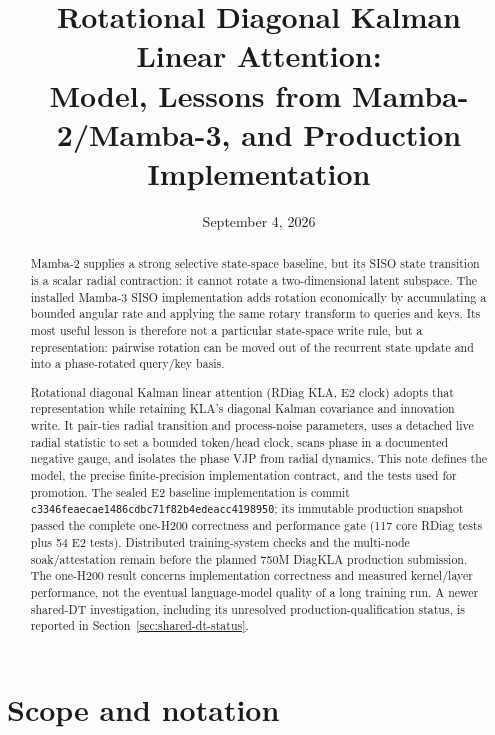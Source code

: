 \documentclass[11pt]{article}
\title{Rotational Diagonal Kalman Linear Attention:\\
Model, Lessons from Mamba-2/Mamba-3, and Production Implementation}
\author{}
\date{September 4, 2026}
\begin{document}
\maketitle

\begin{abstract}
Mamba-2 supplies a strong selective state-space baseline, but its SISO state transition is a
scalar radial contraction: it cannot rotate a two-dimensional latent subspace.  The installed
Mamba-3 SISO implementation adds rotation economically by accumulating a bounded angular rate and
applying the same rotary transform to queries and keys.  Its most useful lesson is therefore not a
particular state-space write rule, but a representation: pairwise rotation can be moved out of the
recurrent state update and into a phase-rotated query/key basis.

Rotational diagonal Kalman linear attention (RDiag KLA, E2 clock) adopts that representation while
retaining KLA's diagonal Kalman covariance and innovation write.  It pair-ties radial transition
and process-noise parameters, uses a detached live radial statistic to set a bounded token/head
clock, scans phase in a documented negative gauge, and isolates the phase VJP from radial dynamics.
This note defines the model, the precise finite-precision implementation contract, and the tests
used for promotion.  The sealed E2 baseline implementation is commit
\texttt{c3346feaecae1486cdbc71f82b4edeacc4198950}; its immutable production snapshot passed the
complete one-H200 correctness and performance gate (117 core RDiag tests plus 54 E2 tests).
Distributed training-system checks and the multi-node soak/attestation remain before the planned
750M DiagKLA production submission.  The one-H200 result concerns implementation correctness and
measured kernel/layer performance, not the eventual language-model quality of a long training run.
A newer shared-DT investigation, including its unresolved production-qualification status, is
reported in Section~\ref{sec:shared-dt-status}.
\end{abstract}

\section{Scope and notation}
\end{document}

